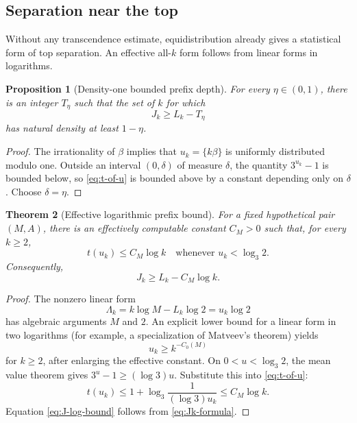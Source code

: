\documentclass[11pt]{article}
\newtheorem{theorem}{Theorem}[section]
\newtheorem{proposition}[theorem]{Proposition}
\theoremstyle{definition}
\begin{document}
\subsection{Separation near the top}

Without any transcendence estimate, equidistribution already gives a
statistical form of top separation.  An effective all-\(k\) form follows
from linear forms in logarithms.

\begin{proposition}[Density-one bounded prefix depth]\label{prop:prefix-density}
For every \(\eta\in(0,1)\), there is an integer \(T_\eta\) such that the set
of \(k\) for which
\begin{equation}\label{eq:J-density}
 J_k\ge L_k-T_\eta
\end{equation}
has natural density at least \(1-\eta\).
\end{proposition}

\begin{proof}
The irrationality of \(\beta\) implies that \(u_k=\{k\beta\}\) is uniformly
distributed modulo one.  Outside an interval \((0,\delta)\) of measure
\(\delta\), the quantity \(3^{u_k}-1\) is bounded below, so
\cref{eq:t-of-u} is bounded above by a constant depending only on
\(\delta\).  Choose \(\delta=\eta\).
\end{proof}

\begin{theorem}[Effective logarithmic prefix bound]\label{thm:prefix-log}
For a fixed hypothetical pair \((M,A)\), there is an effectively computable
constant \(C_M>0\) such that, for every \(k\ge2\),
\begin{equation}\label{eq:t-log-bound}
 t(u_k)\le C_M\log k
 \quad\text{whenever }u_k<\log_3 2.
\end{equation}
Consequently,
\begin{equation}\label{eq:J-log-bound}
 J_k\ge L_k-C_M\log k.
\end{equation}
\end{theorem}

\begin{proof}
The nonzero linear form
\begin{equation}\label{eq:linear-form-prefix}
 \Lambda_k=k\log M-L_k\log2=u_k\log2
\end{equation}
has algebraic arguments \(M\) and \(2\).  An explicit lower bound for a
linear form in two logarithms (for example, a specialization of Matveev's
theorem) yields
\begin{equation}\label{eq:u-baker}
 u_k\ge k^{-C_0(M)}
\end{equation}
for \(k\ge2\), after enlarging the effective constant.  On
\(0<u<\log_3 2\), the mean value theorem gives
\(3^u-1\ge(\log3)u\).  Substitute this into \cref{eq:t-of-u}:
\[
 t(u_k)
 \le1+\log_3\frac1{(\log3)u_k}
 \le C_M\log k.
\]
Equation \cref{eq:J-log-bound} follows from \cref{eq:Jk-formula}.
\end{proof}
\end{document}
